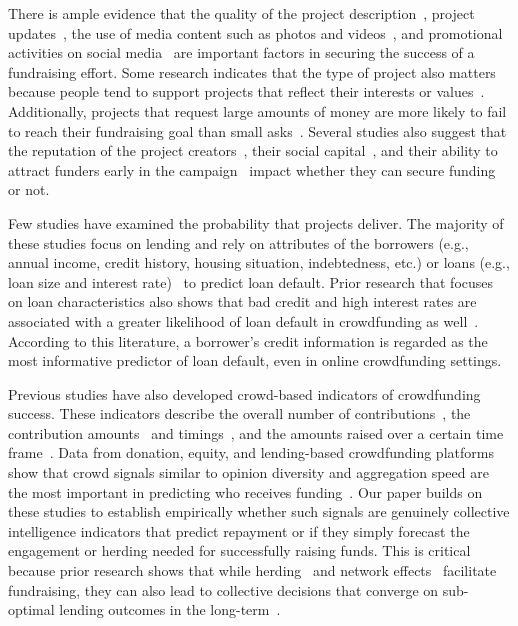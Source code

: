 \documentclass[sigconf]{acmart}
\begin{document}
There is ample evidence that the quality of the project description~\cite{larrimore2011peer,althoff2014ask,mitra2014language}, project updates~\cite{xu2014show}, the use of media content such as photos and videos~\cite{xu2014show,leecontent2018}, and promotional activities on social media~\cite{etter2013launch,lu2014inferring,zhang_predicting_2017} are important factors in securing the success of a fundraising effort. Some research indicates that the type of project also matters because people tend to support projects that reflect their interests or values~\cite{mollick2014dynamics,lukkarinen2016success}. Additionally, projects that request large amounts of money are more likely to fail to reach their fundraising goal than small asks~\cite{cordova2015determinants,cumming2015crowdfunding,mollick2014dynamics}. Several studies also suggest that the reputation of the project creators~\cite{collier2010sending}, their social capital~\cite{chung2015long,horvat2015network,hui2014understanding,mollick2014dynamics,colombo2015internal}, and their ability to attract funders early in the campaign~\cite{solomon2015don,burtch2013empirical,Ceyhan2011,colombo2015internal,agrawal2015crowdfunding,Vulkan2016} impact whether they can secure funding or not.

Few studies have examined the probability that projects deliver. The majority of these studies focus on lending and rely on attributes of the borrowers (e.g., annual income, credit history, housing situation, indebtedness, etc.) or loans (e.g., loan size and interest rate)~\cite{emekter2015evaluating,serrano2015determinants,canfield2018determinants} to predict loan default. Prior research that focuses on loan characteristics also shows that bad credit and high interest rates are associated with a greater likelihood of loan default in crowdfunding as well~\cite{emekter2015evaluating,canfield2018determinants,iyer2015screening}. According to this literature, a borrower's credit information is regarded as the most informative predictor of loan default, even in online crowdfunding settings.

Previous studies have also developed crowd-based indicators of crowdfunding success. These indicators describe the overall number of contributions~\cite{Ceyhan2011}, the contribution amounts~\cite{koning2013experimental,chan2020bellwether} and timings~\cite{solomon2015don,colombo2015internal}, and the amounts raised over a certain time frame~\cite{burtch2013empirical}. Data from donation, equity, and lending-based crowdfunding platforms show that crowd signals similar to opinion diversity and aggregation speed are the most important in predicting who receives funding~\cite{dambanemuya2021multi}. Our paper builds on these studies to establish empirically whether such signals are genuinely collective intelligence indicators that predict repayment or if they simply forecast the engagement or herding needed for successfully raising funds. This is critical because prior research shows that while herding~\cite{Zhang2012,chan2020bellwether} and network effects~\cite{agrawal2015crowdfunding,vismara2018information} facilitate fundraising, they can also lead to collective decisions that converge on sub-optimal lending outcomes in the long-term~\cite{Zhang2012}.
\end{document}
